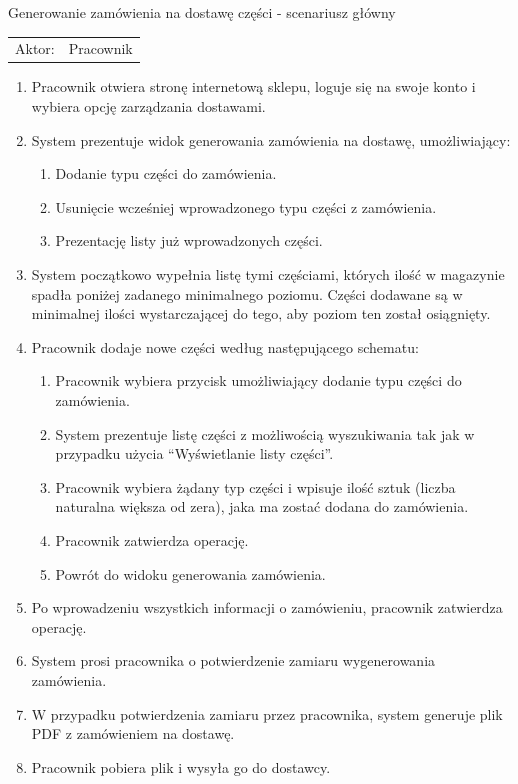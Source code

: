   \item Generowanie zamówienia na dostawę części - scenariusz główny \\
  \begin{tabularx}{\linewidth}{ c X}
  Aktor: & Pracownik \\
  \end{tabularx}
   \begin{enumerate}
    \item Pracownik otwiera stronę internetową sklepu, loguje się na swoje konto i wybiera opcję zarządzania dostawami.
    \item System prezentuje widok generowania zamówienia na dostawę, umożliwiający:
    \begin{enumerate}
      \item Dodanie typu części do zamówienia.
      \item Usunięcie wcześniej wprowadzonego typu części z zamówienia.
      \item Prezentację listy już wprowadzonych części.
    \end{enumerate}
    \item System początkowo wypełnia listę tymi częściami, których ilość w magazynie spadła poniżej zadanego minimalnego poziomu. Części dodawane są w minimalnej ilości wystarczającej do tego, aby poziom ten został osiągnięty.
    \item Pracownik dodaje nowe części według następującego schematu:
    \begin{enumerate}
      \item Pracownik wybiera przycisk umożliwiający dodanie typu części do zamówienia.
      \item System prezentuje listę części z możliwością wyszukiwania tak jak w przypadku użycia ``Wyświetlanie listy części''.
      \item Pracownik wybiera żądany typ części i wpisuje ilość sztuk (liczba naturalna większa od zera), jaka ma zostać dodana do zamówienia.
      \item Pracownik zatwierdza operację.
      \item Powrót do widoku generowania zamówienia.
    \end{enumerate}
    \item Po wprowadzeniu wszystkich informacji o zamówieniu, pracownik zatwierdza operację.
    \item System prosi pracownika o potwierdzenie zamiaru wygenerowania zamówienia.
    \item W przypadku potwierdzenia zamiaru przez pracownika, system generuje plik PDF z zamówieniem na dostawę.
    \item Pracownik pobiera plik i wysyła go do dostawcy.
  \end{enumerate}
  	
